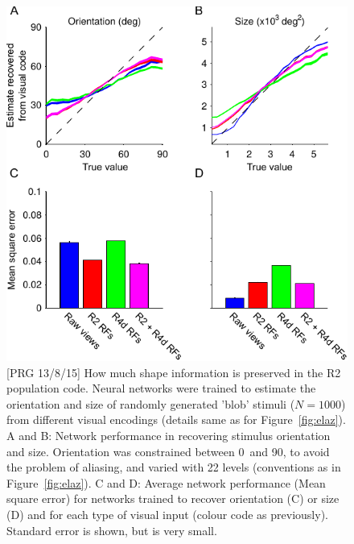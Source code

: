 \begin{figure}
\centering
\includegraphics{figures/orsi}
\caption{[PRG 13/8/15] How much shape information is preserved in the R2 population code.
Neural networks were trained to estimate the orientation and size of randomly generated 'blob' stimuli ($N=1000$) from different visual encodings (details same as for Figure~\ref{fig:elaz}).
A and B: Network performance in recovering stimulus orientation and size. Orientation was constrained between 0\degree\ and 90\degree, to avoid the problem of aliasing, and varied with 22 levels (conventions as in Figure~\ref{fig:elaz}).
C and D: Average network performance (Mean square error) for networks trained to recover orientation (C) or size (D) and for each type of visual input (colour code as previously). Standard error is shown, but is very small.
}
\label{fig:orsi}
\end{figure}